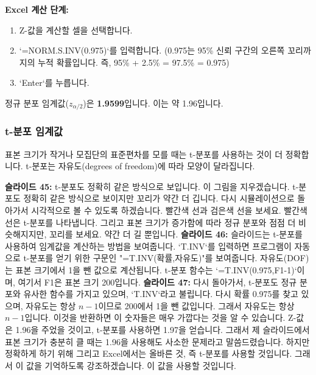 \documentclass[11pt,a4paper]{article}
\begin{document}
\textbf{Excel 계산 단계:}
\begin{enumerate}
    \item Z-값을 계산할 셀을 선택합니다.
    \item `=NORM.S.INV(0.975)`를 입력합니다. (0.975는 95\% 신뢰 구간의 오른쪽 꼬리까지의 누적 확률입니다. 즉, 95\% + 2.5\% = 97.5\% = 0.975)
    \item `Enter`를 누릅니다.
\end{enumerate}
\begin{tcolorbox}[colback=mygreen!10!white, colframe=mygreen!75!black, title=계산 결과: 정규 분포 임계값]
정규 분포 임계값($z_{\alpha/2}$)은 \textbf{1.9599}입니다. 이는 약 1.96입니다.
\end{tcolorbox}

\subsubsection{t-분포 임계값}

표본 크기가 작거나 모집단의 표준편차를 모를 때는 t-분포를 사용하는 것이 더 정확합니다. t-분포는 자유도(degrees of freedom)에 따라 모양이 달라집니다.

\begin{tcolorbox}[title=슬라이드 45-47: 뉴욕 일일 기온 샘플 Excel 시트 (14/22 - 16/22)]
\textbf{슬라이드 45:} t-분포도 정확히 같은 방식으로 보입니다. 이 그림을 지우겠습니다. t-분포도 정확히 같은 방식으로 보이지만 꼬리가 약간 더 깁니다. 다시 시뮬레이션으로 돌아가서 시각적으로 볼 수 있도록 하겠습니다. 빨간색 선과 검은색 선을 보세요. 빨간색 선은 t-분포를 나타냅니다. 그리고 표본 크기가 증가함에 따라 정규 분포와 점점 더 비슷해지지만, 꼬리를 보세요. 약간 더 길 뿐입니다.
\textbf{슬라이드 46:} 슬라이드는 t-분포를 사용하여 임계값을 계산하는 방법을 보여줍니다. `T.INV`를 입력하면 프로그램이 자동으로 t-분포를 얻기 위한 구문인 "=T.INV(확률,자유도)"를 보여줍니다. 자유도(DOF)는 표본 크기에서 1을 뺀 값으로 계산됩니다. t-분포 함수는 `=T.INV(0.975,F1-1)`이며, 여기서 F1은 표본 크기 200입니다.
\textbf{슬라이드 47:} 다시 돌아가서, t-분포도 정규 분포와 유사한 함수를 가지고 있으며, `T.INV`라고 불립니다. 다시 확률 0.975를 찾고 있으며, 자유도는 항상 $n-1$이므로 200에서 1을 뺀 값입니다. 그래서 자유도는 항상 $n-1$입니다. 이것을 반환하면 이 숫자들은 매우 가깝다는 것을 알 수 있습니다. Z-값은 1.96을 주었을 것이고, t-분포를 사용하면 1.97을 얻습니다. 그래서 제 슬라이드에서 표본 크기가 충분히 클 때는 1.96을 사용해도 사소한 문제라고 말씀드렸습니다. 하지만 정확하게 하기 위해 그리고 Excel에서는 올바른 것, 즉 t-분포를 사용할 것입니다. 그래서 이 값을 기억하도록 강조하겠습니다. 이 값을 사용할 것입니다.
\end{tcolorbox}
\end{document}
